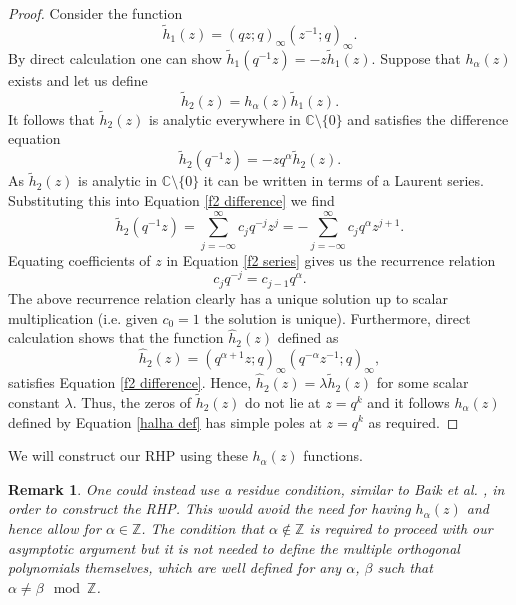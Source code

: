 \documentclass[a4paper,reqno]{amsart}
\numberwithin{equation}{section}
\newtheorem{remark}[theorem]{Remark}
\numberwithin{figure}{section}
\begin{document}
\begin{proof}
    Consider the function
    \[ \tilde{h}_1(z) = (qz;q)_\infty (z^{-1};q)_\infty .\]
    By direct calculation one can show $\tilde{h}_1(q^{-1}z) = -z\tilde{h}_1(z)$. Suppose that $h_\alpha(z)$ exists and let us define
    \begin{equation}\label{halha def}
        \tilde{h}_2(z) = h_{\alpha}(z)\tilde{h}_1(z). 
    \end{equation} 
    It follows that $\tilde{h}_2(z)$ is analytic everywhere in $\mathbb{C}\setminus \{0\}$ and satisfies the difference equation
    \begin{equation}\label{f2 difference}
        \tilde{h}_2(q^{-1}z) = -zq^{\alpha}\tilde{h}_2(z).
    \end{equation} 
    As $\tilde{h}_2(z)$ is analytic in $\mathbb{C}\setminus \{0\}$ it can be written in terms of a Laurent series. Substituting this into Equation \eqref{f2 difference} we find
    \begin{equation}\label{f2 series}
        \tilde{h}_2(q^{-1}z) = \sum_{j=-\infty}^\infty c_jq^{-j}z^j = -\sum_{j=-\infty}^\infty c_jq^{\alpha}z^{j+1} .
    \end{equation}
    Equating coefficients of $z$ in Equation \eqref{f2 series} gives us the recurrence relation
    \[ c_jq^{-j} = c_{j-1}q^{\alpha}.\]
    The above recurrence relation clearly has a unique solution up to scalar multiplication (i.e. given $c_0=1$ the solution is unique). Furthermore, direct calculation shows that the function $\hat{h}_2(z)$ defined as
    \[ \hat{h}_2(z) = (q^{\alpha+1}z;q)_\infty (q^{-\alpha}z^{-1};q)_\infty ,\]
    satisfies Equation \eqref{f2 difference}. Hence, $\hat{h}_2(z)=\lambda \tilde{h}_2(z)$ for some scalar constant $\lambda$. Thus, the zeros of $\tilde{h}_2(z)$ do not lie at $z=q^{k}$ and it follows $ h_{\alpha}(z)$ defined by Equation \eqref{halha def} has simple poles at $z=q^{k}$ as required.
\end{proof}

We will construct our RHP using these $h_\alpha(z)$ functions. 
\begin{remark}
    One could instead use a residue condition, similar to Baik et al. \cite{baik2007discrete}, in order to construct the RHP. This would avoid the need for having $h_\alpha(z)$ and hence allow for $\alpha \in\mathbb{Z}$. The condition that $\alpha \notin \mathbb{Z}$ is required to proceed with our asymptotic argument but it is not needed to define the multiple orthogonal polynomials themselves, which are well defined for any $\alpha$, $\beta$ such that $\alpha\neq \beta \mod \mathbb{Z}$.
\end{remark}
\end{document}
